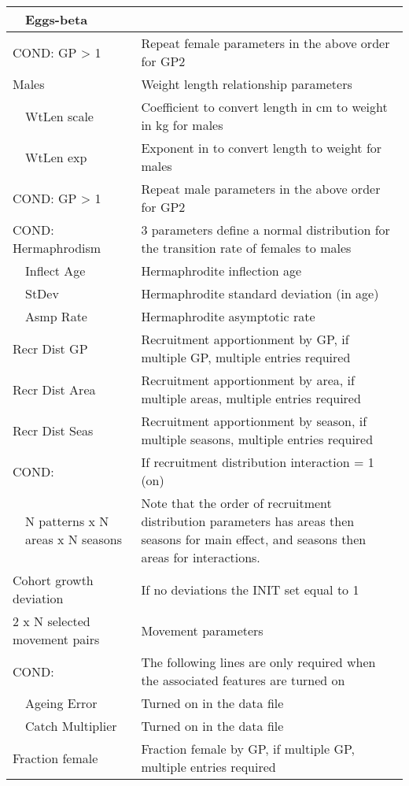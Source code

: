 \begin{center}
\begin{longtable}{p{1cm} p{2.5cm} p{10cm}}
		& Eggs-beta & \\
		\hline
		\multicolumn{2}{l}{COND: GP > 1} & Repeat female parameters in the above order for GP2\\
		\hline
		\multicolumn{2}{l}{Males} & Weight length relationship parameters\\
		& WtLen scale & Coefficient to convert length in cm to weight in kg for males\\
	    & WtLen exp & Exponent in to convert length to weight for males\\
		\hline
		\multicolumn{2}{l}{COND: GP > 1} & Repeat male parameters in the above order for GP2\\
		\hline
		\multicolumn{2}{l}{COND: Hermaphrodism} & 3 parameters define a normal distribution for the transition rate of females to males\\
		& Inflect Age & Hermaphrodite inflection age\\
		& StDev & Hermaphrodite standard deviation (in age) \\
		& Asmp Rate & Hermaphrodite asymptotic rate\\
		\hline
		\multicolumn{2}{l}{Recr Dist GP} & Recruitment apportionment by GP, if multiple GP, multiple entries required\\
		\multicolumn{2}{l}{Recr Dist Area} & Recruitment apportionment by area, if multiple areas, multiple entries required\\
		\multicolumn{2}{l}{Recr Dist Seas} & Recruitment apportionment by season, if multiple seasons, multiple entries required\\
		\hline
		\multicolumn{2}{l}{COND:} & If recruitment distribution interaction = 1 (on)\\
		& N patterns x N areas x N seasons & Note that the order of recruitment distribution parameters has areas then seasons for main effect, and seasons then areas for interactions.\\
		\hline
		\multicolumn{2}{l}{Cohort growth deviation} & If no deviations the INIT set equal to 1\\
		\multicolumn{2}{l}{2 x N selected movement pairs} & Movement parameters\\
		\hline
		\multicolumn{2}{l}{COND:} & The following lines are only required when the associated features are turned on\\
		& Ageing Error & Turned on in the data file\\
		& Catch Multiplier & Turned on in the data file\\
		\hline
		\multicolumn{2}{l}{Fraction female} & Fraction female by GP, if multiple GP, multiple entries required\\
		\hline
	\end{longtable}
\end{center}

